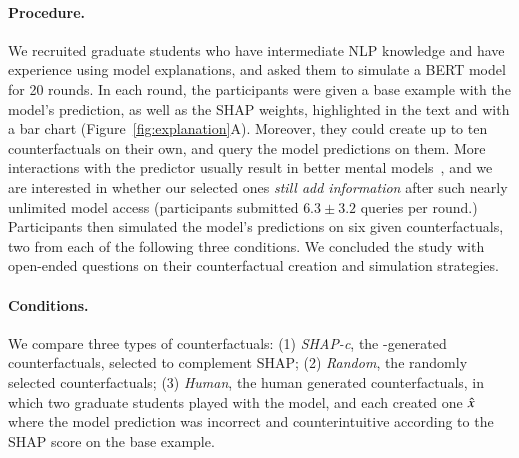 \paragraph{Procedure.}
We recruited  graduate students who have intermediate NLP knowledge and have experience using model explanations, and asked them to simulate a \qqp BERT model for 20 rounds.
In each round, the participants were given a base example with the model's prediction, as well as the SHAP weights, highlighted in the text and with a bar chart (Figure~\ref{fig:explanation}A).
Moreover, they could create up to ten counterfactuals on their own, and query the model predictions on them.
More interactions with the predictor usually result in better mental models~\cite{miller}, and we are interested in whether our selected ones \emph{still add information} after such nearly unlimited model access (participants submitted $6.3\pm3.2$ queries per round.)
Participants then simulated the model's predictions on six given counterfactuals, two from each of the following three conditions.
We concluded the study with open-ended questions on their counterfactual creation and simulation strategies.



\newcommand{\cshap}{\emph{SHAP-c}\xspace}
\newcommand{\crandom}{\emph{Random}\xspace}
\newcommand{\chuman}{\emph{Human}\xspace}
\paragraph{Conditions.} 
We compare three types of counterfactuals:
(1) \cshap, the \sysname-generated counterfactuals, selected to complement SHAP; 
(2) \crandom, the randomly selected \sysname counterfactuals; 
(3) \chuman, the human generated counterfactuals, in which two graduate students played with the model, and each created one $\hat{x}$ where the model prediction was incorrect and counterintuitive according to the SHAP score on the base example.

